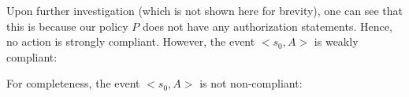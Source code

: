 Upon further investigation (which is not shown here for brevity), one can see that this is because our policy $P$ does not have any authorization statements.
Hence, no action is strongly compliant.
However, the event $<s_0, A>$ is weakly compliant:



For completeness, the event $<s_0, A>$ is not non-compliant:



